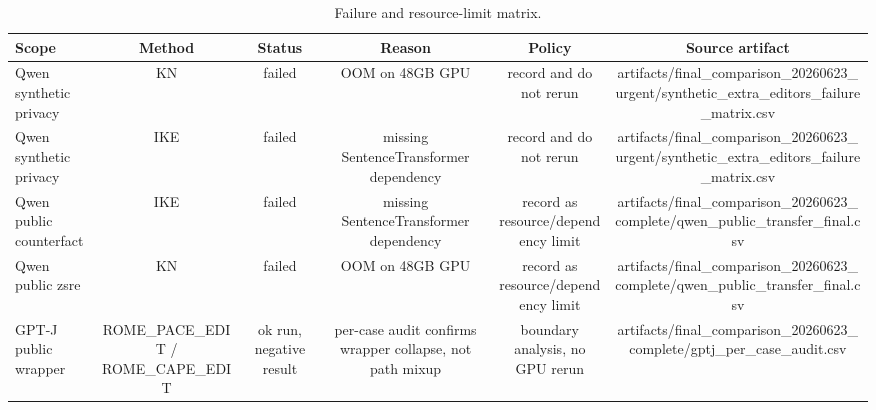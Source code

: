 \begin{table}[t]
\centering
\scriptsize
\caption{Failure and resource-limit matrix.}
\label{tab:failure-resource}
\begin{tabular}{lccccc}
\toprule
Scope & Method & Status & Reason & Policy & Source artifact \\
\midrule
Qwen synthetic privacy & KN & failed & OOM on 48GB GPU & record and do not rerun & artifacts/final\_comparison\_20260623\_urgent/synthetic\_extra\_editors\_failure\_matrix.csv \\
Qwen synthetic privacy & IKE & failed & missing SentenceTransformer dependency & record and do not rerun & artifacts/final\_comparison\_20260623\_urgent/synthetic\_extra\_editors\_failure\_matrix.csv \\
Qwen public counterfact & IKE & failed & missing SentenceTransformer dependency & record as resource/dependency limit & artifacts/final\_comparison\_20260623\_complete/qwen\_public\_transfer\_final.csv \\
Qwen public zsre & KN & failed & OOM on 48GB GPU & record as resource/dependency limit & artifacts/final\_comparison\_20260623\_complete/qwen\_public\_transfer\_final.csv \\
GPT-J public wrapper & ROME\_PACE\_EDIT / ROME\_CAPE\_EDIT & ok run, negative result & per-case audit confirms wrapper collapse, not path mixup & boundary analysis, no GPU rerun & artifacts/final\_comparison\_20260623\_complete/gptj\_per\_case\_audit.csv \\
\bottomrule
\end{tabular}
\end{table}
